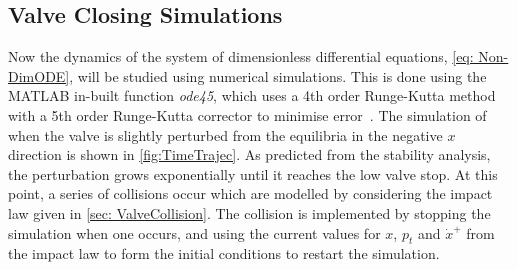 \subsection{Valve Closing Simulations}

Now the dynamics of the system of dimensionless differential equations, \cref{eq: Non-DimODE}, will be studied using numerical simulations. This is done using the MATLAB in-built function \textit{ode45}, which uses a 4th order Runge-Kutta method with a 5th order Runge-Kutta corrector to minimise error~\cite{Shampine1997TheSuite}. The simulation of when the valve is slightly perturbed from the equilibria in the negative $x$ direction is shown in \cref{fig:TimeTrajec}. As predicted from the stability analysis, the perturbation grows exponentially until it reaches the low valve stop. At this point, a series of collisions occur which are modelled by considering the impact law given in \cref{sec: ValveCollision}. The collision is implemented by stopping the simulation when one occurs, and using the current values for $x$, $p_t$ and $\dot{x}^+$ from the impact law to form the initial conditions to restart the simulation.

